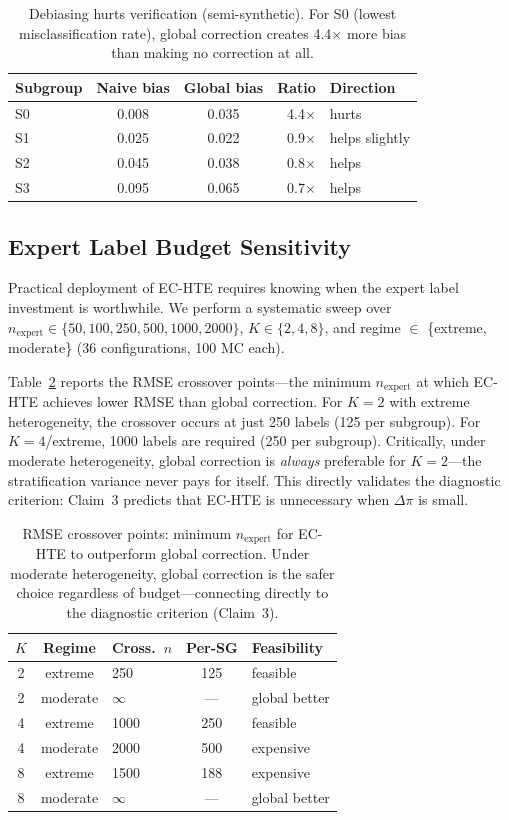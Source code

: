 \documentclass[11pt]{article}
\newcommand{\dpi}{\Delta\pi}
\begin{document}
\begin{table}[t]
\centering
\small
\begin{tabular}{lccrl}
\toprule
Subgroup & Naive bias & Global bias & Ratio & Direction \\
\midrule
S0 & 0.008 & 0.035 & 4.4$\times$ & hurts \\
S1 & 0.025 & 0.022 & 0.9$\times$ & helps slightly \\
S2 & 0.045 & 0.038 & 0.8$\times$ & helps \\
S3 & 0.095 & 0.065 & 0.7$\times$ & helps \\
\bottomrule
\end{tabular}
\caption{Debiasing hurts verification (semi-synthetic). For S0 (lowest misclassification rate), global correction creates 4.4$\times$ more bias than making no correction at all.}
\label{tab:semisyn_hurts}
\end{table}


\subsection{Expert Label Budget Sensitivity}
\label{sec:budget}

Practical deployment of EC-HTE requires knowing when the expert label investment is worthwhile.
We perform a systematic sweep over $n_{\text{expert}} \in \{50, 100, 250, 500, 1000, 2000\}$, $K \in \{2, 4, 8\}$, and regime $\in$ \{extreme, moderate\} (36 configurations, 100 MC each).

Table~\ref{tab:crossover} reports the RMSE crossover points---the minimum $n_{\text{expert}}$ at which EC-HTE achieves lower RMSE than global correction.
For $K{=}2$ with extreme heterogeneity, the crossover occurs at just 250 labels (125 per subgroup).
For $K{=}4$/extreme, 1000 labels are required (250 per subgroup).
Critically, under moderate heterogeneity, global correction is \emph{always} preferable for $K{=}2$---the stratification variance never pays for itself.
This directly validates the diagnostic criterion: Claim~3 predicts that EC-HTE is unnecessary when $\dpi$ is small.

\begin{table}[t]
\centering
\small
\begin{tabular}{cclcl}
\toprule
$K$ & Regime & Cross.\ $n$ & Per-SG & Feasibility \\
\midrule
2 & extreme & 250 & 125 & feasible \\
2 & moderate & $\infty$ & --- & global better \\
4 & extreme & 1000 & 250 & feasible \\
4 & moderate & 2000 & 500 & expensive \\
8 & extreme & 1500 & 188 & expensive \\
8 & moderate & $\infty$ & --- & global better \\
\bottomrule
\end{tabular}
\caption{RMSE crossover points: minimum $n_{\text{expert}}$ for EC-HTE to outperform global correction. Under moderate heterogeneity, global correction is the safer choice regardless of budget---connecting directly to the diagnostic criterion (Claim~3).}
\label{tab:crossover}
\end{table}
\end{document}
